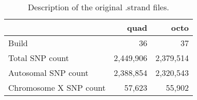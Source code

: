\begin{table}[h]
\centering
\begin{tabular}{l|rr}
                       & quad      & octo      \\
\hline
Build                  & 36        & 37        \\
Total SNP count        & 2,449,906 & 2,379,514 \\
Autosomal SNP count    & 2,388,854 & 2,320,543 \\
Chromosome X SNP count & 57,623    & 55,902   \\
\hline
\end{tabular}
\caption{Description of the original .strand files.}
\label{tab:strand_files}
\end{table}